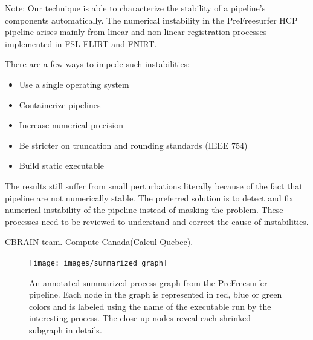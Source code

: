 \documentclass{article}
\newcommand{\note}[2]{\color{blue}Note: #1\color{black}}
\begin{document}
{\note{Our technique is able to characterize the stability of a pipeline's 
components automatically. The numerical instability in the 
PreFreesurfer HCP pipeline arises mainly from linear and non-linear 
registration processes implemented in FSL FLIRT and FNIRT. 

There are a few ways to impede such instabilities:
\begin{itemize}
\item Use a single operating system
\item Containerize pipelines
\item Increase numerical precision
\item Be stricter on truncation and rounding standards (IEEE 754)
\item Build static executable
\end{itemize}

The results still suffer from small perturbations literally because of 
the fact that pipeline are not numerically stable. The preferred 
solution is to detect and fix numerical instability of the pipeline 
instead of masking the problem. These processes need to be reviewed to 
understand and correct the cause of instabilities. }

\section{Acknowledgments}

CBRAIN team. Compute Canada(Calcul Quebec).


\begin{figure}[H]
  \texttt{[image: images/summarized\_graph]}
  \caption{An annotated summarized process graph from the PreFreesurfer pipeline.
Each node in the graph is represented in red, blue or green colors and is labeled 
using the name of the executable run by the interesting process. The close up nodes 
reveal each shrinked subgraph in details.}
  \label{fig:summarized-graph}
\end{figure}

}
\end{document}
